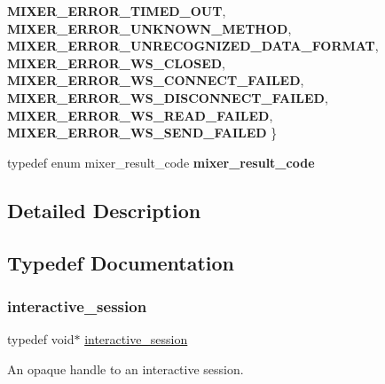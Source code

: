 \begin{DoxyCompactItemize}
{\bfseries M\+I\+X\+E\+R\+\_\+\+E\+R\+R\+O\+R\+\_\+\+T\+I\+M\+E\+D\+\_\+\+O\+UT}, 
{\bfseries M\+I\+X\+E\+R\+\_\+\+E\+R\+R\+O\+R\+\_\+\+U\+N\+K\+N\+O\+W\+N\+\_\+\+M\+E\+T\+H\+OD}, 
{\bfseries M\+I\+X\+E\+R\+\_\+\+E\+R\+R\+O\+R\+\_\+\+U\+N\+R\+E\+C\+O\+G\+N\+I\+Z\+E\+D\+\_\+\+D\+A\+T\+A\+\_\+\+F\+O\+R\+M\+AT}, 
\newline
{\bfseries M\+I\+X\+E\+R\+\_\+\+E\+R\+R\+O\+R\+\_\+\+W\+S\+\_\+\+C\+L\+O\+S\+ED}, 
{\bfseries M\+I\+X\+E\+R\+\_\+\+E\+R\+R\+O\+R\+\_\+\+W\+S\+\_\+\+C\+O\+N\+N\+E\+C\+T\+\_\+\+F\+A\+I\+L\+ED}, 
{\bfseries M\+I\+X\+E\+R\+\_\+\+E\+R\+R\+O\+R\+\_\+\+W\+S\+\_\+\+D\+I\+S\+C\+O\+N\+N\+E\+C\+T\+\_\+\+F\+A\+I\+L\+ED}, 
{\bfseries M\+I\+X\+E\+R\+\_\+\+E\+R\+R\+O\+R\+\_\+\+W\+S\+\_\+\+R\+E\+A\+D\+\_\+\+F\+A\+I\+L\+ED}, 
\newline
{\bfseries M\+I\+X\+E\+R\+\_\+\+E\+R\+R\+O\+R\+\_\+\+W\+S\+\_\+\+S\+E\+N\+D\+\_\+\+F\+A\+I\+L\+ED}
 \}
\item 
\mbox{\label{group___interactivity_gacb2d49b6c81314ea0f832210c5904d7d}} 
typedef enum mixer\+\_\+result\+\_\+code {\bfseries mixer\+\_\+result\+\_\+code}
\end{DoxyCompactItemize}


\subsection{Detailed Description}


\subsection{Typedef Documentation}
\mbox{\label{group___interactivity_ga6d8819d38b8dc8994a2299cf22a65a31}} 
\subsubsection{\texorpdfstring{interactive\+\_\+session}{interactive\_session}}
{\footnotesize\ttfamily typedef void$\ast$ \mbox{\hyperlink{group___interactivity_ga6d8819d38b8dc8994a2299cf22a65a31}{interactive\+\_\+session}}}



An opaque handle to an interactive session. 


